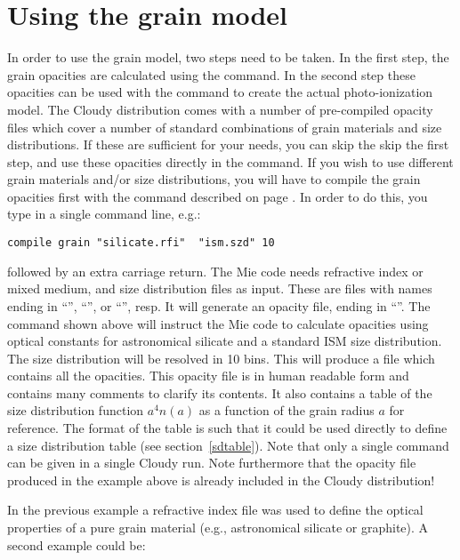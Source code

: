 \section{Using the grain model}
\label{grain:compile}
In order to use the grain model, two steps need to be taken. In the first
step, the grain opacities are calculated using the 
command. In the second step these opacities can be used with the
 command to create the actual photo-ionization model. The
Cloudy distribution comes with a number of pre-compiled opacity files which
cover a number of standard combinations of grain materials and size
distributions. If these are sufficient for your needs, you can skip the skip
the first step, and use these opacities directly in the 
command. If you wish to use different grain materials and/or size
distributions, you will have to compile the grain opacities first with the
 command described on page \pageref{sec:CompileGrains}.
In order to do this, you type in a single command line, e.g.:

\begin{verbatim}
compile grain "silicate.rfi"  "ism.szd" 10
\end{verbatim}

\noindent followed by an extra carriage return. The Mie code needs refractive
index or mixed medium, and size distribution files as input. These are files
with names ending in ``'', ``'', or
``'', resp. It will generate an opacity file, ending in
``''. The command shown above will instruct the Mie
code to calculate opacities using optical constants for astronomical silicate
and a \citet{Mathis1977} standard ISM size distribution. The size
distribution will be resolved in 10 bins. This will produce a file
 which contains all the opacities. This
opacity file is in human readable form and contains many comments to clarify
its contents. It also contains a table of the size distribution function $a^4
n(a)$ as a function of the grain radius $a$ for reference. The format of the
table is such that it could be used directly to define a size distribution
table (see section~\ref{sdtable}). Note that only a single  command can be given in a single Cloudy run. Note furthermore that
the opacity file produced in the example above is already included in the
Cloudy distribution!

In the previous example a refractive index file was used to define the optical
properties of a pure grain material (e.g., astronomical silicate or graphite).
A second example could be:

